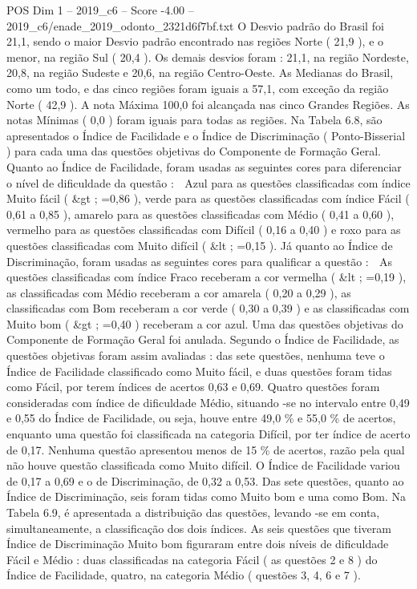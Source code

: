 \begin{textsample}{POS Dim 1 – 2019\_c6 – Score -4.00 – 2019\_c6/enade\_2019\_odonto\_2321d6f7bf.txt}
O Desvio padrão do Brasil foi 21,1, sendo o maior Desvio padrão encontrado nas regiões Norte ( 21,9 ), e o menor, na região Sul ( 20,4 ).
Os demais desvios foram : 21,1, na região Nordeste, 20,8, na região Sudeste e 20,6, na região Centro-Oeste.
As Medianas do Brasil, como um todo, e das cinco regiões foram iguais a 57,1, com exceção da região Norte ( 42,9 ).
A nota Máxima 100,0 foi alcançada nas cinco Grandes Regiões.
As notas Mínimas ( 0,0 ) foram iguais para todas as regiões.
Na Tabela 6.8, são apresentados o Índice de Facilidade e o Índice de Discriminação ( Ponto-Bisserial ) para cada uma das questões objetivas do Componente de Formação Geral.
Quanto ao Índice de Facilidade, foram usadas as seguintes cores para diferenciar o nível de dificuldade da questão :  Azul para as questões classificadas com índice Muito fácil ( \&gt ; =0,86 ), verde para as questões classificadas com índice Fácil ( 0,61 a 0,85 ), amarelo para as questões classificadas com Médio ( 0,41 a 0,60 ), vermelho para as questões classificadas com Difícil ( 0,16 a 0,40 ) e roxo para as questões classificadas com Muito difícil ( \&lt ; =0,15 ).
Já quanto ao Índice de Discriminação, foram usadas as seguintes cores para qualificar a questão :  As questões classificadas com índice Fraco receberam a cor vermelha ( \&lt ; =0,19 ), as classificadas com Médio receberam a cor amarela ( 0,20 a 0,29 ), as classificadas com Bom receberam a cor verde ( 0,30 a 0,39 ) e as classificadas com Muito bom ( \&gt ; =0,40 ) receberam a cor azul.
Uma das questões objetivas do Componente de Formação Geral foi anulada.
Segundo o Índice de Facilidade, as questões objetivas foram assim avaliadas : das sete questões, nenhuma teve o Índice de Facilidade classificado como Muito fácil, e duas questões foram tidas como Fácil, por terem índices de acertos 0,63 e 0,69.
Quatro questões foram consideradas com índice de dificuldade Médio, situando -se no intervalo entre 0,49 e 0,55 do Índice de Facilidade, ou seja, houve entre 49,0 \% e 55,0 \% de acertos, enquanto uma questão foi classificada na categoria Difícil, por ter índice de acerto de 0,17.
Nenhuma questão apresentou menos de 15 \% de acertos, razão pela qual não houve questão classificada como Muito difícil.
O Índice de Facilidade variou de 0,17 a 0,69 e o de Discriminação, de 0,32 a 0,53.
Das sete questões, quanto ao Índice de Discriminação, seis foram tidas como Muito bom e uma como Bom.
Na Tabela 6.9, é apresentada a distribuição das questões, levando -se em conta, simultaneamente, a classificação dos dois índices.
As seis questões que tiveram Índice de Discriminação Muito bom figuraram entre dois níveis de dificuldade Fácil e Médio : duas classificadas na categoria Fácil ( as questões 2 e 8 ) do Índice de Facilidade, quatro, na categoria Médio ( questões 3, 4, 6 e 7 ).

\end{textsample}
